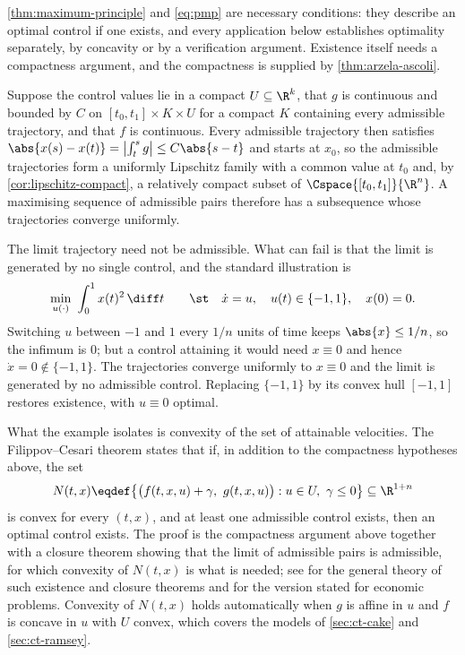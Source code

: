 \begin{remark}\label{rem:ct-existence}
	\autoref{thm:maximum-principle} and \eqref{eq:pmp} are necessary conditions:
	they describe an optimal control if one exists, and every application below
	establishes optimality separately, by concavity or by a verification argument.
	Existence itself needs a compactness argument, and the compactness is supplied
	by \autoref{thm:arzela-ascoli}.

	Suppose the control values lie in a compact $U\subseteq\R^{k}$, that $g$ is
	continuous and bounded by $C$ on $[t_0,t_1]\times K\times U$ for a compact $K$
	containing every admissible trajectory, and that $f$ is continuous. Every
	admissible trajectory then satisfies
	$\abs{x(s)-x(t)}=\bigl\lvert\int_t^sg\bigr\rvert\leq C\abs{s-t}$ and starts at
	$x_0$, so the admissible trajectories form a uniformly Lipschitz family with a
	common value at $t_0$ and, by \autoref{cor:lipschitz-compact}, a relatively
	compact subset of $\Cspace{[t_0,t_1]}{\R^{n}}$. A maximising sequence of
	admissible pairs therefore has a subsequence whose trajectories converge
	uniformly.

	The limit trajectory need not be admissible. What can fail is that the limit is
	generated by no single control, and the standard illustration is
	\[
		\min_{u(\cdot)}\ \int_0^1x(t)^2\,\diff t
		\qquad\st\quad \dot x=u,\quad u(t)\in\{-1,1\},\quad x(0)=0 .
	\]
	Switching $u$ between $-1$ and $1$ every $1/n$ units of time keeps
	$\abs{x}\leq1/n$, so the infimum is $0$; but a control attaining it would need
	$x\equiv0$ and hence $\dot x=0\notin\{-1,1\}$. The trajectories converge
	uniformly to $x\equiv0$ and the limit is generated by no admissible control.
	Replacing $\{-1,1\}$ by its convex hull $[-1,1]$ restores existence, with
	$u\equiv0$ optimal.

	What the example isolates is convexity of the set of attainable velocities. The
	Filippov--Cesari theorem states that if, in addition to the compactness
	hypotheses above, the set
	\[
		N(t,x)\eqdef\bigl\{\bigl(f(t,x,u)+\gamma,\ g(t,x,u)\bigr)
		: u\in U,\ \gamma\leq0\bigr\}\subseteq\R^{1+n}
	\]
	is convex for every $(t,x)$, and at least one admissible control exists, then an
	optimal control exists. The proof is the compactness argument above together
	with a closure theorem showing that the limit of admissible pairs is admissible,
	for which convexity of $N(t,x)$ is what is needed; see
	\textcite{cesari1983optimization} for the general theory of such existence and
	closure theorems and \textcite{seierstad1987optimal} for the version stated for
	economic problems. Convexity of $N(t,x)$ holds automatically when $g$ is affine
	in $u$ and $f$ is concave in $u$ with $U$ convex, which covers the models of
	\autoref{sec:ct-cake} and \autoref{sec:ct-ramsey}.
\end{remark}

